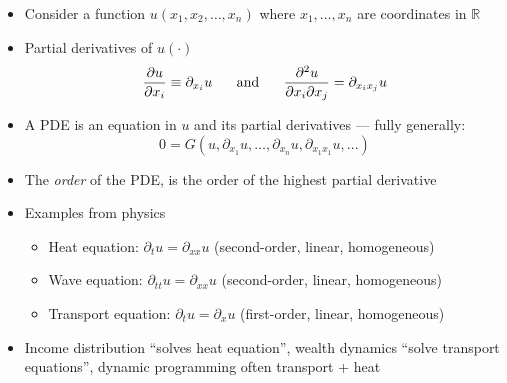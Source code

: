 \documentclass[10pt]{beamer}
\begin{document}
\begin{frame}{}
\begin{itemize}
\item Consider a function $u(x_1, x_2, \ldots, x_n)$ where $x_1, \ldots, x_n$ are coordinates in $\mathbb R$

\item Partial derivatives of $u(\cdot)$
\begin{equation*}
	\frac{\partial u}{\partial x_i} \equiv \partial_{x_i} u \hspace{5mm} \text{ and } \hspace{5mm} \frac{\partial^2 u}{\partial x_i \partial x_j} = \partial_{x_i x_j} u
\end{equation*}

\item A PDE is an equation in $u$ and its partial derivatives --- fully generally:
\begin{equation*}
	0 = G(u, \partial_{x_1} u, \ldots, \partial_{x_n} u, \partial_{x_1 x_1} u, \ldots )
\end{equation*}

\item The \textit{order} of the PDE, is the order of the highest partial derivative

\item Examples from physics
\begin{itemize}
	\item Heat equation: $\partial_t u = \partial_{xx} u$ (second-order, linear, homogeneous)
	
	\vspace{-3mm}
	\item Wave equation: $\partial_{tt} u = \partial_{xx} u$ (second-order, linear, homogeneous)
	
	\vspace{-3mm}
	\item Transport equation: $\partial_t u = \partial_x u$ (first-order, linear, homogeneous)
\end{itemize}

\item Income distribution ``solves heat equation'', wealth dynamics ``solve transport equations'', dynamic programming often transport + heat 
\end{itemize}
\end{frame}
\end{document}
